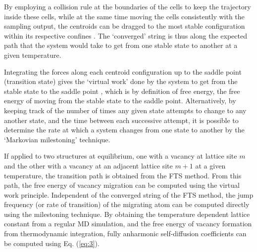 \documentclass{article}
\begin{document}
By employing a collision rule at the boundaries of the cells to keep the trajectory inside these cells, while at the same time moving the cells consistently with the sampling output, the centroids can be dragged to the most stable configuration within its respective confines \cite{Vanden-Eijnden2009}. The \enquote*{converged} string is thus along the expected path that the system would take to get from one stable state to another at a given temperature.

Integrating the forces along each centroid configuration up to the saddle point (transition state) gives the \enquote*{virtual work} done by the system to get from the stable state to the saddle point \cite{Swinburne2017}, which is by definition of free energy, the free energy of moving from the stable state to the saddle point. Alternatively, by keeping track of the number of times any given state attempts to change to any another state, and the time between each successive attempt, it is possible to determine the rate at which a system changes from one state to another by the \enquote*{Markovian milestoning} \cite{Vanden-Eijnden2009a} technique.

If applied to two structures at equilibrium, one with a vacancy at lattice site $m$ and the other with a vacancy at an adjacent lattice site $m+1$ at a given temperature, the transition path is obtained from the FTS method. From this path, the free energy of vacancy migration can be computed using the virtual work principle. Independent of the converged string of the FTS method, the jump frequency (or rate of transition) of the migrating atom can be computed directly using the milestoning technique. By obtaining the temperature dependent lattice constant from a regular MD simulation, and the free energy of vacancy formation from thermodynamic integration, fully anharmonic self-diffusion coefficients can be computed using Eq. (\ref{eq:3}).
\end{document}
